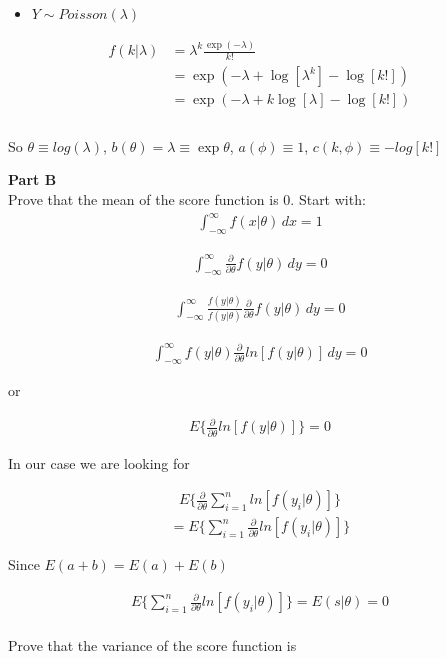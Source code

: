 \documentclass[12pt]{amsart}
\begin{document}
\bigskip
\bigskip


\begin{itemize}
    \item $Y \sim Poisson(\lambda) $
\end{itemize}
\bigskip
\bigskip

\begin{align*}
f(k|\lambda)&= \lambda^k \frac{\exp(-\lambda)}{k!}\\
&= \exp(-\lambda +\log[\lambda^k] - \log[k!])\\
&= \exp(-\lambda +k\log[\lambda] - \log[k!])\\
\end{align*}\\

So $\theta \equiv log(\lambda)$, $b(\theta) = \lambda \equiv \exp \theta$, $a(\phi)\equiv1$, $c(k,\phi)\equiv-log[k!]$

\bigskip

\bigskip
{\bf Part B} \\
\bigskip
Prove that the mean of the score function is 0. Start with:
\begin{align*}
     \int_{-\infty}^{\infty} f(x|\theta) \,dx = 1
\end{align*}


\begin{align*}
     \int_{-\infty}^{\infty} \frac{\partial}{\partial \theta}f(y|\theta) \,dy = 0
\end{align*}

\begin{align*}
     \int_{-\infty}^{\infty} \frac{f(y|\theta) }{f(y|\theta) }\frac{\partial}{\partial \theta}f(y|\theta) \,dy = 0
\end{align*}


\begin{align*}
     \int_{-\infty}^{\infty} f(y|\theta)\frac{\partial}{\partial \theta}ln[f(y|\theta)] \,dy = 0
\end{align*}

or 


\begin{align*}
     E\{\frac{\partial}{\partial \theta}ln[f(y|\theta)] \} = 0
\end{align*}

In our case we are looking for

\begin{align*}
     E\{\frac{\partial}{\partial \theta}\sum_{i=1}^{n}  ln  [f(y_i|\theta)] \} 
\end{align*}
\begin{align*}
     =E\{ \sum_{i=1}^{n} \frac{\partial}{\partial \theta} ln [f(y_i|\theta)] \} 
\end{align*}

Since $ E(a+b) = E(a) + E(b)$

\begin{align*}
   E\{ \sum_{i=1}^{n} \frac{\partial}{\partial \theta} ln [f(y_i|\theta)] \}  = E(s|\theta)=0
\end{align*}\\

Prove that the variance of the score function is
\end{document}
